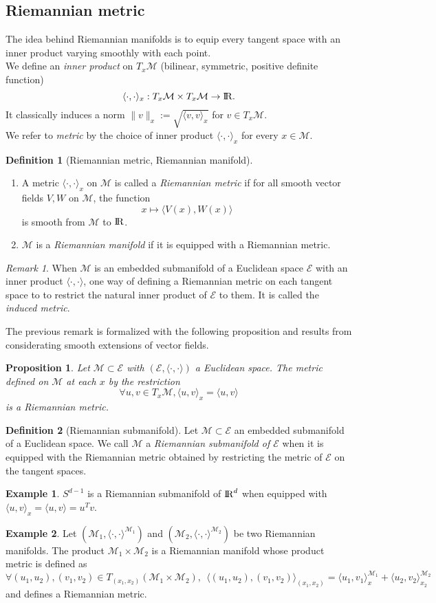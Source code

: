 \documentclass[10pt,a4paper]{book}
\theoremstyle{definition}
\newtheorem{defn}{Definition}[section]
\newtheorem{exm}{Example}[section]
\theoremstyle{plain}
\newtheorem{prop}{Proposition}[section]
\theoremstyle{remark}
\newtheorem{rmk}{Remark}[section]
\newcommand{\E}{\mathcal{E}}
\newcommand \M {\mathcal{M}}
\def\R{{\rm I\kern-0.16em R}}
\begin{document}
\subsection{Riemannian metric}
The idea behind Riemannian manifolds is to equip every tangent space with an inner product varying smoothly with each point.\\ We define an \emph{inner product} on $T_x\M$ (bilinear, symmetric, positive definite function) $$\langle \cdot,\cdot \rangle_x: T_x\M \times T_x\M \to \R.$$ It classically induces a norm $\|v\|_x:=\sqrt{\langle v,v\rangle_x}$ for $v\in T_x\M$.
\\ We refer to \emph{metric} by the choice of inner product $\langle \cdot, \cdot \rangle_x$ for every $x\in \M$.
\begin{defn}[Riemannian metric, Riemannian manifold]~
\begin{enumerate}
\item 
A metric $\langle \cdot, \cdot \rangle_x$ on $\M$ is called a \emph{Riemannian metric} if for all smooth vector fields $V,W$ on $\M$, the function
$$x\mapsto \langle V(x),W(x)\rangle$$
is smooth from $\M$ to $\R$.
\item $\M$ is a \emph{Riemannian manifold} if it is equipped with a Riemannian metric.
\end{enumerate}
\end{defn}
\begin{rmk}
When $\M$ is an embedded submanifold of a Euclidean space $\E$ with an inner product $\langle \cdot, \cdot \rangle$, one way of defining a Riemannian metric on each tangent space to to restrict the natural inner product of $\E$ to them. It is called the \emph{induced metric}.
\end{rmk}
The previous remark is formalized with the following proposition and results from considerating smooth extensions of vector fields.
\begin{prop}
Let $\M \subset \E$ with $(\E,\langle\cdot,\cdot \rangle)$ a Euclidean space. The metric defined on $\M$ at each $x$ by the restriction
$$\forall u,v \in T_x\M, \langle u,v\rangle_x=\langle u,v\rangle$$
is a Riemannian metric.
\end{prop}

\begin{defn}[Riemannian submanifold]
Let $\M \subset \E$ an embedded submanifold of a Euclidean space. We call $\M$ a \emph{Riemannian submanifold of $\E$} when it is equipped with the Riemannian metric obtained by restricting the metric of $\E$ on the tangent spaces.
\end{defn}
\begin{exm}
$S^{d-1}$ is a Riemannian submanifold of $\R^d$ when equipped with $\langle u,v\rangle_x =\langle u,v\rangle=u^{T}v$.
\end{exm}
\begin{exm}
Let $(\M_1, \langle \cdot,\cdot\rangle^{\M_1})$ and $(\M_2,\langle \cdot,\cdot \rangle^{\M_2})$ be two Riemannian manifolds. The product $\M_1\times \M_2$ is a Riemannian manifold whose product metric is defined as
$$\forall (u_1,u_2),(v_1,v_2)\in T_{(x_1,x_2)}(\M_1\times \M_2),~~\langle (u_1,u_2),(v_1,v_2)\rangle_{(x_1,x_2)}=\langle u_1,v_1\rangle_x^{\M_1}+\langle u_2,v_2\rangle_{x_2}^{\M_2}$$
and defines a Riemannian metric.
\end{exm}
\end{document}
